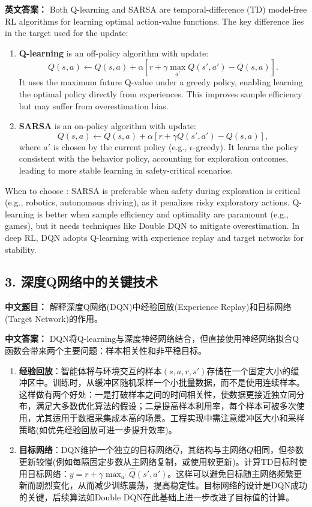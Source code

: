 \documentclass[10pt,a4paper]{ctexart}
\begin{document}
\textbf{英文答案：}  
Both Q-learning and SARSA are temporal-difference (TD) model-free RL algorithms for learning optimal action-value functions. The key difference lies in the target used for the update:

\begin{enumerate}
    \item \textbf{Q-learning} is an off-policy algorithm with update:
  \[
  Q(s,a) \leftarrow Q(s,a) + \alpha \left[ r + \gamma \max_{a'} Q(s',a') - Q(s,a) \right].
  \]
  It uses the maximum future Q-value under a greedy policy, enabling learning the optimal policy directly from experiences. This improves sample efficiency but may suffer from overestimation bias.

    \item \textbf{SARSA} is an on-policy algorithm with update:
  \[
  Q(s,a) \leftarrow Q(s,a) + \alpha \left[ r + \gamma Q(s',a') - Q(s,a) \right],
  \]
  where \(a'\) is chosen by the current policy (e.g., \(\epsilon\)-greedy). It learns the policy consistent with the behavior policy, accounting for exploration outcomes, leading to more stable learning in safety-critical scenarios.
\end{enumerate}

 When to choose : SARSA is preferable when safety during exploration is critical (e.g., robotics, autonomous driving), as it penalizes risky exploratory actions. Q-learning is better when sample efficiency and optimality are paramount (e.g., games), but it needs techniques like Double DQN to mitigate overestimation. In deep RL, DQN adopts Q-learning with experience replay and target networks for stability.

\subsection*{3. 深度Q网络中的关键技术}
\textbf{中文题目：} 解释深度Q网络(DQN)中经验回放(Experience Replay)和目标网络(Target Network)的作用。

\textbf{中文答案：}  
DQN将Q-learning与深度神经网络结合，但直接使用神经网络拟合Q函数会带来两个主要问题：样本相关性和非平稳目标。

\begin{enumerate}
    \item \textbf{经验回放}：智能体将与环境交互的样本\((s,a,r,s')\)存储在一个固定大小的缓冲区中。训练时，从缓冲区随机采样一个小批量数据，而不是使用连续样本。这样做有两个好处：一是打破样本之间的时间相关性，使数据更接近独立同分布，满足大多数优化算法的假设；二是提高样本利用率，每个样本可被多次使用，尤其适用于数据采集成本高的场景。工程实现中需注意缓冲区大小和采样策略(如优先经验回放可进一步提升效率)。

    \item \textbf{目标网络}：DQN维护一个独立的目标网络\(\hat{Q}\)，其结构与主网络\(Q\)相同，但参数更新较慢(例如每隔固定步数从主网络复制，或使用软更新)。计算TD目标时使用目标网络：\(y = r + \gamma \max_{a'} \hat{Q}(s',a')\)。这样可以避免目标随主网络频繁更新而剧烈变化，从而减少训练震荡，提高稳定性。目标网络的设计是DQN成功的关键，后续算法如Double DQN在此基础上进一步改进了目标值的计算。
\end{enumerate}
\end{document}
